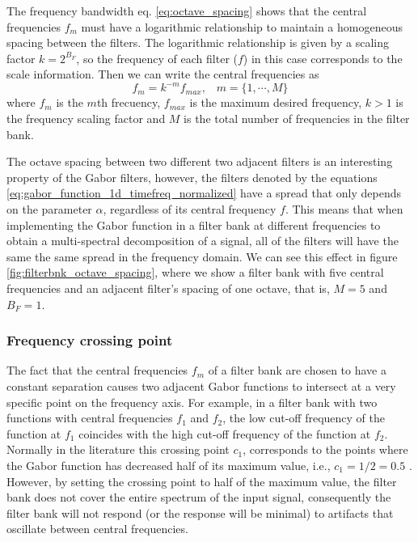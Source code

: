 The frequency bandwidth eq. \eqref{eq:octave_spacing} shows that the central frequencies $f_m$ must have a logarithmic relationship to maintain a homogeneous spacing between the filters. The logarithmic relationship is given by a scaling factor $k=2^{B_F}$, so the frequency of each filter ($f$) in this case corresponds to the scale information. Then we can write the central frequencies as
\begin{equation}
	f_m = k^{-m} f_{max}\textrm{,} \quad m = \{1, \cdots, M\} \label{eq:filterbank_frequencies}
\end{equation} 
where $f_m$ is the $m$th frecuency, $f_{max}$ is the maximum desired frequency, $k>1$ is the frequency scaling factor and $M$ is the total number of frequencies in the filter bank.

The octave spacing between two different two adjacent filters is an interesting property of the Gabor filters, however, the filters denoted by the equations \eqref{eq:gabor_function_1d_timefreq_normalized} have a spread that only depends on the parameter $\alpha$, regardless of its central frequency $f$. This means that when implementing the Gabor function in a filter bank at different frequencies to obtain a multi-spectral decomposition of a signal, all of the filters will have the same the same spread in the frequency domain. We can see this effect in figure \ref{fig:filterbnk_octave_spacing}, where we show a filter bank with five central frequencies and an adjacent filter's spacing of one octave, that is, $M=5$ and $B_F = 1$. 


\subsubsection{Frequency crossing point}
The fact that the central frequencies $f_m$ of a filter bank are chosen to have a constant separation causes two adjacent Gabor functions to intersect at a very specific point on the frequency axis. For example, in a filter bank with two functions with central frequencies $f_1$ and $f_2$, the low cut-off frequency of the function at $f_1$ coincides with the high cut-off frequency of the function at $f_2$. Normally in the literature this crossing point $c_1$, corresponds to the points where the Gabor function has decreased half of its maximum value, i.e., $c_1= 1/2=0.5$ \citep{Granlund:CGIP:1978}. However, by setting the crossing point to half of the maximum value, the filter bank does not cover the entire spectrum of the input signal, consequently the filter bank will not respond (or the response will be minimal) to artifacts that oscillate between central frequencies. 

